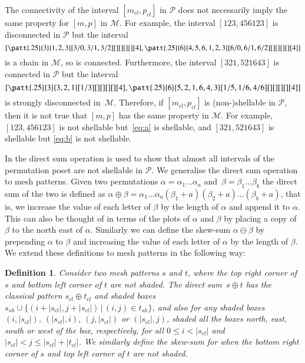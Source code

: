 \documentclass[preprint,11pt]{elsarticle}
\newtheorem{defn}[thm]{Definition}\crefname{defn}{Definition}{Definitions}
\newcommand\cl[1]{#1_{cl}}
\newcommand\sh[1]{#1_{sh}}
\numberwithin{equation}{section}
\numberwithin{figure}{section}
\numberwithin{thm}{section}
\begin{document}
The connectivity of the interval $[\cl{m},\cl{p}]$ in $\mathcal{P}$ does not
necessarily imply the same property for $[m,p]$ in $\mathcal{M}$. For example,
the interval $[123,456123]$ is disconnected in $\mathcal{P}$ but the interval
\begin{equation}\label{eq:a}\left[\patt{.25}{3}{1,2,3}[3/0,3/1,3/2][][][][][4]
,\patt{.25}{6}{4,5,6,1,2,3}[6/0,6/1,6/2][][][][][4]\right]\end{equation} 
is a chain in $\mathcal{M}$, so is connected. Furthermore, the interval
$[321,521643]$ is connected in $\mathcal{P}$ but the interval
\begin{equation}\label{eq:b}\left[\patt{.25}{3}{3,2,1}[1/3][][][][][4],
\patt{.25}{6}{5,2,1,6,4,3}[1/5,1/6,4/6][][][][][4]\right]\end{equation}
is strongly disconnected in~$\mathcal{M}$. Therefore, if $[\cl{m},\cl{p}]$
is (non-)shellable in $\mathcal{P}$, then it is not true that $[m,p]$ has
the same property in $\mathcal{M}$. For example, $[123,456123]$ is not
shellable but~\eqref{eq:a} is shellable, and $[321,521643]$ is shellable
but \eqref{eq:b} is not shellable.

In \cite{McSt13} the direct sum operation is used to show that almost all
intervals of the permutation poset are not shellable in $\mathcal{P}$. We generalise the direct sum operation to
mesh patterns. Given two permutations $\alpha=\alpha_1\ldots\alpha_a$
and~$\beta=\beta_1\ldots\beta_b$ the direct sum of the two is defined as
$\alpha\oplus\beta=\alpha_1\ldots\alpha_a(\beta_1+a)(\beta_2+a)\ldots(\beta_b+a)$,
that is, we increase the value of each letter of $\beta$ by the
length of $\alpha$ and append it to $\alpha$. This can also be thought of in terms of the plots of $\alpha$
and $\beta$ by placing a copy of $\beta$ to the north east of $\alpha$.
Similarly we can define the skew-sum $\alpha\ominus\beta$ by
prepending $\alpha$ to $\beta$ and increasing the value of each letter of $\alpha$
by the length of $\beta$. We extend these definitions to mesh patterns in the following way:

\begin{defn}\label{defn:directsum}
Consider two mesh patterns $s$ and $t$, where the top right corner of $s$
and bottom left corner of $t$ are not shaded. The direct sum~$s\oplus t$ has the classical pattern
$\cl{s}\oplus\cl{t}$ and shaded boxes $\sh{s}\cup\{(i+|\cl{s}|,j+|\cl{s}|)\,|\,(i,j)\in\sh{t}\}$,
and also for any shaded boxes $(i,|\cl{s}|)$, $(|\cl{s}|,i)$, $(j,|\cl{s}|)$ or $(|\cl{s}|,j)$,
shaded all the boxes north, east, south or west of the box, respectively,
for all $0\le i< |\cl{s}|$ and $|\cl{s}|< j\le |\cl{s}|+|\cl{t}|$.  We similarly
define the skew-sum for when the bottom right corner of $s$ and top left corner of $t$ are not shaded.
\end{defn}
\end{document}
